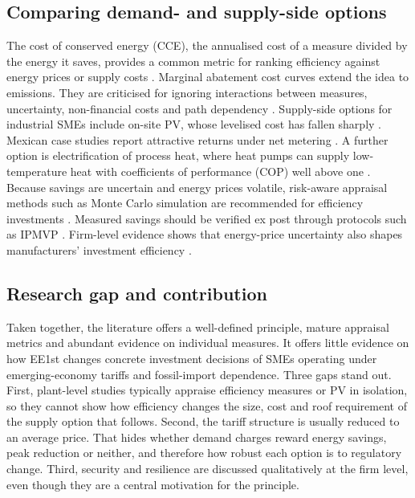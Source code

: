 \documentclass[preprint,12pt,authoryear]{elsarticle}
\begin{document}
\subsection{Comparing demand- and supply-side options}
The cost of conserved energy (CCE), the annualised cost of a measure divided by the energy it saves, provides a common metric for ranking efficiency against energy prices or supply costs \citep{meier1982,tesema2015}. Marginal abatement cost curves extend the idea to emissions. They are criticised for ignoring interactions between measures, uncertainty, non-financial costs and path dependency \citep{kesicki2012,huang2016}. Supply-side options for industrial SMEs include on-site PV, whose levelised cost has fallen sharply \citep{irena2025costs}. Mexican case studies report attractive returns under net metering \citep{delfinportela2023,linvill2017}. A further option is electrification of process heat, where heat pumps can supply low-temperature heat with coefficients of performance (COP) well above one \citep{arpagaus2018,schlosser2020,madeddu2020,iea2022heatpumps}. Because savings are uncertain and energy prices volatile, risk-aware appraisal methods such as Monte Carlo simulation are recommended for efficiency investments \citep{mills2006,jackson2010}. Measured savings should be verified ex post through protocols such as IPMVP \citep{evo2022ipmvp}. Firm-level evidence shows that energy-price uncertainty also shapes manufacturers' investment efficiency \citep{anh2024}.

\subsection{Research gap and contribution}
Taken together, the literature offers a well-defined principle, mature appraisal metrics and abundant evidence on individual measures. It offers little evidence on how EE1st changes concrete investment decisions of SMEs operating under emerging-economy tariffs and fossil-import dependence. Three gaps stand out. First, plant-level studies typically appraise efficiency measures or PV in isolation, so they cannot show how efficiency changes the size, cost and roof requirement of the supply option that follows. Second, the tariff structure is usually reduced to an average price. That hides whether demand charges reward energy savings, peak reduction or neither, and therefore how robust each option is to regulatory change. Third, security and resilience are discussed qualitatively at the firm level, even though they are a central motivation for the principle.
\end{document}

